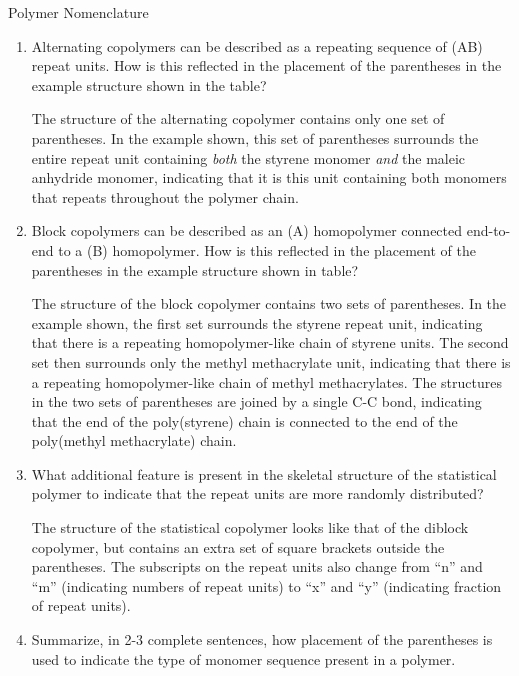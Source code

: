 \begin{activity}{Polymer Nomenclature}
\begin{ctqs}
\begin{enumerate}
			\item Alternating copolymers can be described as a repeating sequence of (AB) repeat units.  How is this reflected in the placement of the parentheses in the example structure shown in the table?
			
				\begin{solution}[1in]
				The structure of the alternating copolymer contains only one set of parentheses.  In the example shown, this set of parentheses surrounds the entire repeat unit containing \emph{both} the styrene monomer \emph{and} the maleic anhydride monomer, indicating that it is this unit containing both monomers that repeats throughout the polymer chain.
				\end{solution}
			
			\item Block copolymers can be described as an (A) homopolymer connected end-to-end to a (B) homopolymer.  How is this reflected in the placement of the parentheses in the example structure shown in table?  
			
				\begin{solution}[1in]
				The structure of the block copolymer contains two sets of parentheses.  In the example shown, the first set surrounds the styrene repeat unit, indicating that there is a repeating homopolymer-like chain of styrene units.  The second set then surrounds only the methyl methacrylate unit, indicating that there is a repeating homopolymer-like chain of methyl methacrylates.  The structures in the two sets of parentheses are joined by a single C-C bond, indicating that the end of the poly(styrene) chain is connected to the end of the poly(methyl methacrylate) chain.
				\end{solution}

			\item What additional feature is present in the skeletal structure of the statistical polymer to indicate that the repeat units are more randomly distributed?
			
				\begin{solution}[1in]
				The structure of the statistical copolymer looks like that of the diblock copolymer, but contains an extra set of square brackets outside the parentheses.  The subscripts on the repeat units also change from ``n'' and ``m'' (indicating numbers of repeat units) to ``x'' and ``y'' (indicating fraction of repeat units).
				\end{solution}
			
			\item Summarize, in 2-3 complete sentences, how placement of the parentheses is used to indicate the type of monomer sequence present in a polymer.
			

\end{enumerate}
\end{ctqs}
\end{activity}
